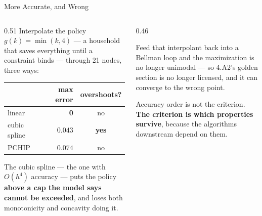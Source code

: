 \begin{frame}{More Accurate, and Wrong}
\begin{columns}[T]
\begin{column}{0.51\textwidth}
\small
Interpolate the policy $g(k)=\min(k,4)$ --- a household that saves everything until a constraint binds --- through 21 nodes, three ways:
\medskip
\begin{center}\footnotesize
\begin{tabularx}{\linewidth}{@{}>{\raggedright\arraybackslash}X r c@{}}
\toprule
 & \textbf{max error} & \textbf{overshoots?} \\
\midrule
linear & \textbf{0} & no \\
cubic spline & $0.043$ & \textbf{yes} \\
PCHIP & $0.074$ & no \\
\bottomrule
\end{tabularx}
\end{center}
\medskip
The cubic spline --- the one with $O(h^{4})$ accuracy --- puts the policy \textbf{above a cap the model says cannot be exceeded}, and loses both monotonicity and concavity doing it.
\end{column}
\begin{column}{0.46\textwidth}
\begin{cautionbox}[title=\textbf{Why this is not a small thing}]\small
Feed that interpolant back into a Bellman loop and the maximization is no longer unimodal --- so 4.A2's golden section is no longer licensed, and it can converge to the wrong point.
\end{cautionbox}
\medskip
\begin{takeawaybox}\footnotesize
Accuracy order is not the criterion. \textbf{The criterion is which properties survive}, because the algorithms downstream depend on them.
\end{takeawaybox}
\end{column}
\end{columns}
\end{frame}

